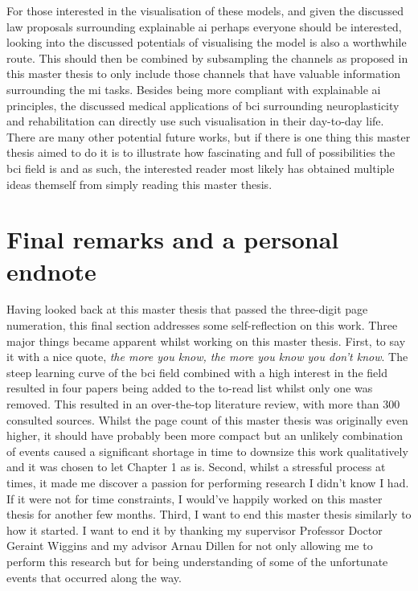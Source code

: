For those interested in the visualisation of these models, and given the discussed law proposals surrounding explainable \gls{ai} perhaps everyone should be interested, looking into the discussed potentials of visualising the model is also a worthwhile route.
This should then be combined by subsampling the channels as proposed in this master thesis to only include those channels that have valuable information surrounding the \gls{mi} tasks.
Besides being more compliant with explainable \gls{ai} principles, the discussed medical applications of \gls{bci} surrounding neuroplasticity and rehabilitation can directly use such visualisation in their day-to-day life.
There are many other potential future works, but if there is one thing this master thesis aimed to do it is to illustrate how fascinating and full of possibilities the \gls{bci} field is and as such, the interested reader most likely has obtained multiple ideas themself from simply reading this master thesis.

\section{Final remarks and a personal endnote}
\label{sec:discussion_final_remarks}

Having looked back at this master thesis that passed the three-digit page numeration, this final section addresses some self-reflection on this work.
Three major things became apparent whilst working on this master thesis.
First, to say it with a nice quote, \textit{the more you know, the more you know you don't know}.
The steep learning curve of the \gls{bci} field combined with a high interest in the field resulted in four papers being added to the to-read list whilst only one was removed.
This resulted in an over-the-top literature review, with more than 300 consulted sources.
Whilst the page count of this master thesis was originally even higher, it should have probably been more compact but an unlikely combination of events caused a significant shortage in time to downsize this work qualitatively and it was chosen to let Chapter 1 as is.
Second, whilst a stressful process at times, it made me discover a passion for performing research I didn't know I had.
If it were not for time constraints, I would've happily worked on this master thesis for another few months.
Third, I want to end this master thesis similarly to how it started.
I want to end it by thanking my supervisor Professor Doctor Geraint Wiggins and my advisor Arnau Dillen for not only allowing me to perform this research but for being understanding of some of the unfortunate events that occurred along the way.